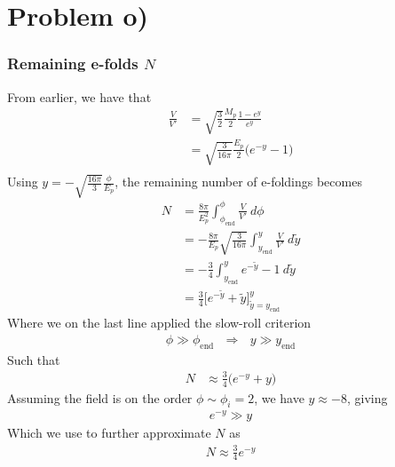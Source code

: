 \documentclass[reprint,english,notitlepage]{revtex4-1}  %
\numberwithin{equation}{section}
\begin{document}
\section{Problem o)}
\subsubsection{Remaining e-folds $N$}
From earlier, we have that
\begin{align}
	\frac{V}{V'} &= \sqrt{\frac{3}{2}}\frac{M_p}{2} \frac{1-e^y}{e^y} \\
							 &= \sqrt{\frac{3}{16\pi}}\frac{E_p}{2} \bigg( e^{-y} -1 \bigg) \\
\end{align}
Using $y=-\sqrt{\frac{16\pi}{3}} \frac{\phi}{E_p}$, the remaining number of
e-foldings becomes
\begin{align}
	N &= \frac{8\pi}{E_p^2} \int_{\phi_{\mathrm{end}}}^\phi \frac{V}{V'}\ d\phi \\
		&= -\frac{8\pi}{E_p} \sqrt{\frac{3}{16\pi}}\int_{y_{\mathrm{end}}}^y \frac{V}{V'}\ d\tilde{y} \\
		&= -\frac{3}{4}\int_{y_{\mathrm{end}}}^y e^{-\tilde{y}} -1\ d\tilde{y} \\
		&= \frac{3}{4}\bigg[ e^{-\tilde{y}} + \tilde{y}\bigg]_{\tilde{y}=y_{\mathrm{end}}}^y
\end{align}
Where we on the last line applied the slow-roll criterion
\begin{align}
	\phi \gg \phi_{\mathrm{end}} \ \ \ \Rightarrow \ \ \ y \gg y_{\mathrm{end}}
\end{align}
Such that
\begin{align}
 N &\approx \frac{3}{4}\bigg( e^{-y} + y\bigg)
\end{align}
Assuming the field is on the order $\phi\sim\phi_i = 2$, we have $y \approx -8$,
giving
\begin{align}
	e^{-y} \gg y
\end{align}
Which we use to further approximate $N$ as
\begin{align}
	N \approx \frac{3}{4} e^{-y}
\end{align}
\end{document}
